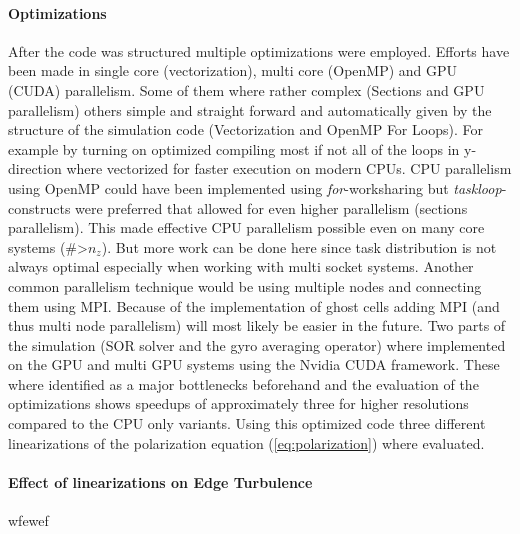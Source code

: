 \documentclass[master.tex]{subfiles}
\begin{document}
\paragraph{Optimizations}
After the code was structured multiple optimizations were employed. Efforts have been made in single core (vectorization), multi core (OpenMP) and GPU (CUDA) parallelism. Some of them where rather complex (Sections and GPU parallelism) others simple and straight forward and automatically given by the structure of the simulation code (Vectorization and OpenMP For Loops). For example by turning on optimized compiling most if not all of the loops in y-direction where vectorized for faster execution on modern CPUs.\newline
CPU parallelism using OpenMP could have been implemented using \textit{for}-worksharing but \textit{taskloop}-constructs were preferred that allowed for even higher parallelism (sections parallelism). This made effective CPU parallelism possible even on many core systems (\#>$n_z$). But more work can be done here since task distribution is not always optimal especially when working with multi socket systems. Another common parallelism technique would be using multiple nodes and connecting them using \ac{MPI}. Because of the implementation of ghost cells adding \ac{MPI} (and thus multi node parallelism) will most likely be easier in the future.\newline
Two parts of the simulation (\ac{SOR} solver and the gyro averaging operator) where implemented on the GPU and multi GPU systems using the Nvidia CUDA framework. These where identified as a major bottlenecks beforehand and the evaluation of the optimizations shows speedups of approximately three for higher resolutions compared to the CPU only variants. Using this optimized code three different linearizations of the polarization equation (\autoref{eq:polarization}) where evaluated.

\paragraph{Effect of linearizations on Edge Turbulence}


wfewef
\end{document}
